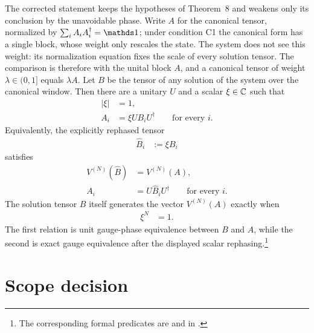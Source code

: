 \documentclass{article}
\begin{document}
The corrected statement keeps the hypotheses of Theorem~8 and weakens only its
conclusion by the unavoidable phase. Write $A$ for the canonical tensor,
normalized by $\sum_iA_iA_i^\dagger=\Id$; under condition C1 the canonical
form has a single block, whose weight only rescales the state. The system does
not see this weight: its normalization equation fixes the scale of every
solution tensor. The comparison is therefore with the unital block $A$, and a
canonical tensor of weight $\lambda\in(0,1]$ equals $\lambda A$. Let $B$ be the
tensor of any solution of the system over the canonical window. Then there are
a unitary $U$ and a scalar $\xi\in\mathbb{C}$ such that
\begin{align}
    |\xi|
     & =1,
    \label{eq:pgvwc07_quadratic_reconstruction_phase_corrected_unit_modulus} \\
    A_i
     & =\xi UB_iU^\dagger
    \qquad\text{for every }i.
    \label{eq:pgvwc07_quadratic_reconstruction_phase_corrected_conjugacy}
\end{align}
Equivalently, the explicitly rephased tensor
\begin{align}
    \widehat B_i
     & :=\xi B_i
    \label{eq:pgvwc07_quadratic_reconstruction_phase_corrected_rephasing}
\end{align}
satisfies
\begin{align}
    V^{(N)}(\widehat B)
     & =V^{(N)}(A),
    \label{eq:pgvwc07_quadratic_reconstruction_phase_rephased_same_state} \\
    A_i
     & =U\widehat B_iU^\dagger
    \qquad\text{for every }i.
    \label{eq:pgvwc07_quadratic_reconstruction_phase_rephased_exact_conjugacy}
\end{align}
The solution tensor $B$ itself generates the vector $V^{(N)}(A)$ exactly when
\begin{align}
    \xi^N
     & =1.
    \label{eq:pgvwc07_quadratic_reconstruction_phase_corrected_root_condition}
\end{align}
The first relation is unit gauge-phase equivalence between $B$ and $A$, while
the second is exact gauge equivalence after the displayed scalar
rephasing.\footnote{The corresponding formal predicates are
     and
     in .}

\section{Scope decision}
\end{document}
